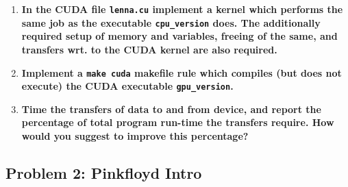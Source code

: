 \begin{enumerate}

\item \textbf{In the CUDA file \texttt{lenna.cu} implement a kernel which performs the same job as the executable \texttt{cpu\_version} does. The additionally required setup of memory and variables, freeing of the same, and transfers wrt. to the CUDA kernel are also required.}

\item \textbf{Implement a \texttt{make cuda} makefile rule which compiles (but does not execute) the CUDA executable \texttt{gpu\_version}.}

\item \textbf{Time the transfers of data to and from device, and report the percentage of total program run-time the transfers require. How would you suggest to improve this percentage?}

\end{enumerate}

\subsection*{Problem 2: Pinkfloyd Intro}



